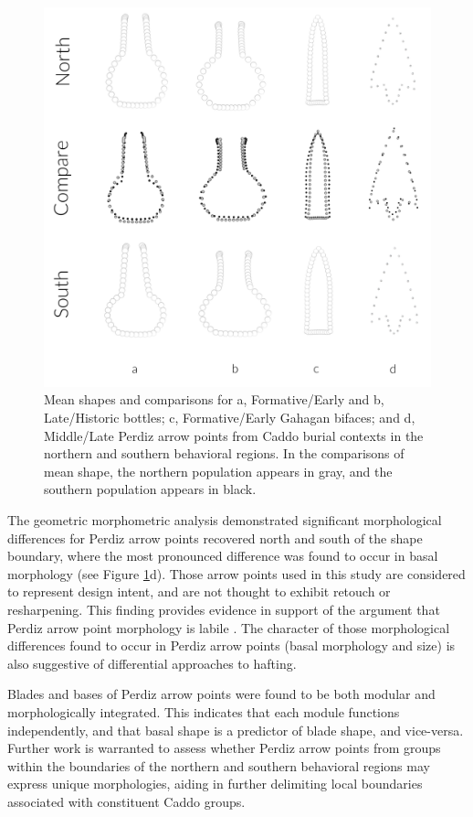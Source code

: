 \documentclass[smallextended]{svjour3}       %
\begin{document}
\begin{figure}
\includegraphics[width=1\linewidth]{ms-figs/figure6} \caption{Mean shapes and comparisons for a, Formative/Early and b, Late/Historic bottles; c, Formative/Early Gahagan bifaces; and d, Middle/Late Perdiz arrow points from Caddo burial contexts in the northern and southern behavioral regions. In the comparisons of mean shape, the northern population appears in gray, and the southern population appears in black.}\label{fig:fig6}
\end{figure}

The geometric morphometric analysis demonstrated significant
morphological differences for Perdiz arrow points recovered north and
south of the shape boundary, where the most pronounced difference was
found to occur in basal morphology (see Figure \ref{fig:fig6}d). Those
arrow points used in this study are considered to represent design
intent, and are not thought to exhibit retouch or resharpening. This
finding provides evidence in support of the argument that Perdiz arrow
point morphology is labile \cite{RN9364}. The character of those
morphological differences found to occur in Perdiz arrow points (basal
morphology and size) is also suggestive of differential approaches to
hafting.

Blades and bases of Perdiz arrow points were found to be both modular
and morphologically integrated. This indicates that each module
functions independently, and that basal shape is a predictor of blade
shape, and vice-versa. Further work is warranted to assess whether
Perdiz arrow points from groups within the boundaries of the northern
and southern behavioral regions may express unique morphologies, aiding
in further delimiting local boundaries associated with constituent Caddo
groups.
\end{document}
